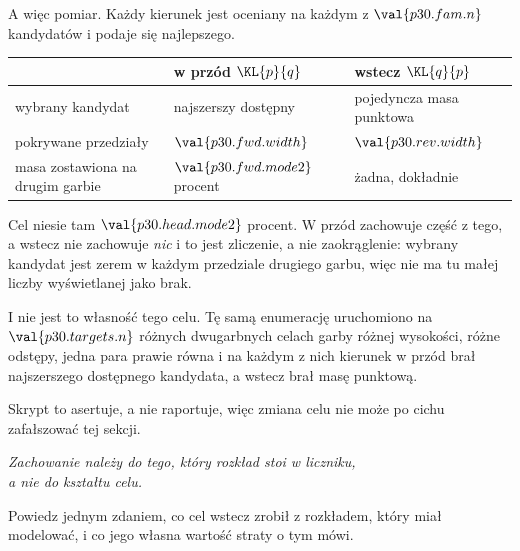 \begin{fr}
A więc pomiar. Każdy kierunek jest oceniany na każdym z
$\val{p30.fam.n}$ kandydatów i podaje się najlepszego.

\begin{center}
\begin{tabularx}{\linewidth}{@{}lXX@{}}
\toprule
& \textbf{w przód} $\KL{p}{q}$ & \textbf{wstecz} $\KL{q}{p}$ \\
\midrule
wybrany kandydat & najszerszy dostępny & pojedyncza masa punktowa \\
pokrywane przedziały & $\val{p30.fwd.width}$ & $\val{p30.rev.width}$ \\
masa zostawiona na drugim garbie & $\val{p30.fwd.mode2}$ procent & żadna, dokładnie \\
\bottomrule
\end{tabularx}
\end{center}

Cel niesie tam $\val{p30.head.mode2}$ procent. W przód zachowuje część z
tego, a wstecz nie zachowuje \emph{nic} \dash{} i to jest zliczenie, a nie
zaokrąglenie: wybrany kandydat jest zerem w każdym przedziale drugiego
garbu, więc nie ma tu małej liczby wyświetlanej jako brak.
\end{fr}

\begin{fr}
I nie jest to własność tego celu. Tę samą enumerację uruchomiono na
$\val{p30.targets.n}$ różnych dwugarbnych celach \dash{} garby różnej
wysokości, różne odstępy, jedna para prawie równa \dash{} i na każdym z nich
kierunek w przód brał najszerszego dostępnego kandydata, a wstecz brał masę
punktową.

Skrypt to asertuje, a nie raportuje, więc zmiana celu nie może po cichu
zafałszować tej sekcji.

\begin{center}
\emph{Zachowanie należy do tego, który rozkład stoi w liczniku,\\
a nie do kształtu celu.}
\end{center}

Powiedz jednym zdaniem, co cel wstecz zrobił z rozkładem, który miał
modelować, i co jego własna wartość straty o tym mówi.
\dotline
\nextframe
\end{fr}

